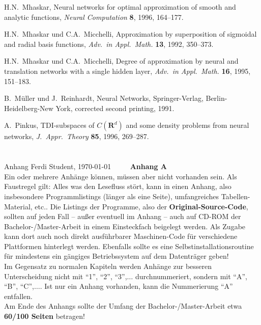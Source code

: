 \documentclass[12pt,twoside]{report}   %
\newcommand {\cpr}{Ferdi Student, \today}
\newcommand{\RR}{\mathbf{R}}
\begin{document}
\begin{thebibliography}{llll}
 H.N.\ Mhaskar,
      Neural networks for optimal approximation of smooth and analytic functions,
      {\sl Neural Computation} {\bf 8}, 1996, 164--177.

 H.N.\ Mhaskar und C.A.\ Micchelli,
      Approximation by superposition of sigmoidal
      and radial basis functions,
      {\sl Adv.\ in Appl.\ Math.} {\bf 13}, 1992, 350--373.

 H.N.\ Mhaskar und C.A.\ Micchelli,
      Degree of approximation by neural and translation networks with 
      a single hidden layer,
      {\sl Adv.\ in Appl.\ Math.} {\bf 16}, 1995, 151--183.

 B.\ Müller und J.\ Reinhardt,
      Neural Networks, Springer-Verlag, Berlin-Heidelberg-New York, 
      corrected second printing, 1991.

 A.\ Pinkus, 
      TDI-subspaces of $C(\RR^d)$ and some density problems from neural networks,
      {\sl J.\ Appr.\ Theory} {\bf 85}, 1996, 269--287.

\end{thebibliography}


\chapter*{}
\markboth{\ \ \ \  {\tiny \cpr} \hfill Anhang}
         {Anhang \hfill {\tiny \cpr} \ \ \ \ }
\normalsize %
\noindent
{\bf \LARGE Anhang A} \\[0.4cm]
Ein oder mehrere Anhänge können, müssen aber nicht vorhanden sein.
Als Faustregel gilt: Alles was den Lesefluss stört, kann in einen
Anhang, also insbesondere Programmlistings (länger als eine Seite),
umfangreiches Tabellen-Material, etc.. Die Listings der Programme,
also der {\bf Original-Source-Code}, 
sollten auf jeden Fall -- außer eventuell im Anhang -- auch auf 
CD-ROM  der Bachelor-/Master-Arbeit in einem Einsteckfach beigelegt
werden. Als Zugabe 
kann dort  auch noch direkt ausführbarer Maschinen-Code für verschiedene
Plattformen hinterlegt  werden. Ebenfalls sollte es eine
Selbstinstallationsroutine für mindestens ein gängiges Betriebssystem auf dem
Datenträger geben! \\ 
Im Gegensatz zu normalen Kapiteln werden Anhänge zur besseren Unterscheidung
nicht mit "`1"', "`2"', "`3"',$\ldots$ durchnummeriert, sondern mit
"`A"', "`B"', "`C"',$\ldots$. Ist nur ein Anhang vorhanden, kann die
Nummerierung "`A"' entfallen. \\[0.2cm]
Am Ende des Anhangs sollte der Umfang der Bachelor-/Master-Arbeit etwa 
{\bf 60/100 Seiten} betragen! 
\end{document}
